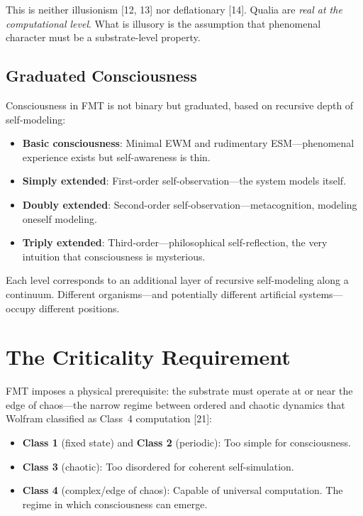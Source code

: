 \documentclass[11pt]{article}
\begin{document}
This is neither illusionism [12, 13] nor deflationary [14]. Qualia are \emph{real at the computational level}. What is illusory is the assumption that phenomenal character must be a substrate-level property.

\subsection{Graduated Consciousness}

Consciousness in FMT is not binary but graduated, based on recursive depth of self-modeling:

\begin{itemize}[nosep]
\item \textbf{Basic consciousness}: Minimal EWM and rudimentary ESM---phenomenal experience exists but self-awareness is thin.
\item \textbf{Simply extended}: First-order self-observation---the system models itself.
\item \textbf{Doubly extended}: Second-order self-observation---metacognition, modeling oneself modeling.
\item \textbf{Triply extended}: Third-order---philosophical self-reflection, the very intuition that consciousness is mysterious.
\end{itemize}

Each level corresponds to an additional layer of recursive self-modeling along a continuum. Different organisms---and potentially different artificial systems---occupy different positions.

\section{The Criticality Requirement}

FMT imposes a physical prerequisite: the substrate must operate at or near the edge of chaos---the narrow regime between ordered and chaotic dynamics that Wolfram classified as Class~4 computation [21]:

\begin{itemize}[nosep]
\item \textbf{Class 1} (fixed state) and \textbf{Class 2} (periodic): Too simple for consciousness.
\item \textbf{Class 3} (chaotic): Too disordered for coherent self-simulation.
\item \textbf{Class 4} (complex/edge of chaos): Capable of universal computation. The regime in which consciousness can emerge.
\end{itemize}
\end{document}
